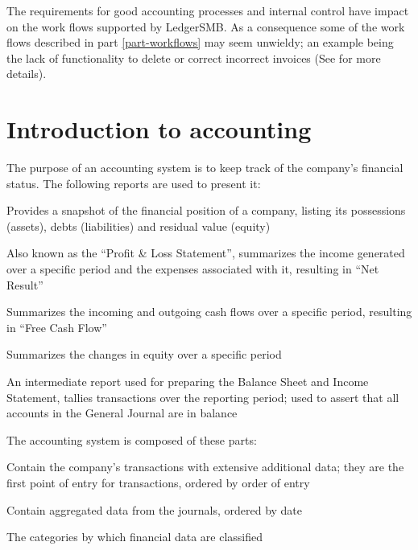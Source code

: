 The requirements for good accounting processes and internal control have impact
on the work flows supported by LedgerSMB. As a consequence some of the work flows
described in part \ref{part-workflows} may seem unwieldy; an example being the
lack of functionality to delete or correct incorrect invoices (See  for more details).



\chapter{Introduction to accounting}
\label{cha-accounting-introduction}

The purpose of an accounting system is to keep track of the company's financial status.  The following reports are used to
present it:

\begin{description}[style=nextline]
	\item[Balance Sheet] Provides a snapshot of the financial position of a company, listing its possessions (assets), debts (liabilities) and residual value (equity)
	\item[Income Statement] Also known as the ``Profit \& Loss Statement'', summarizes the income generated over a specific period and the expenses associated with it, resulting in ``Net Result''
	\item[Cashflow Statement\footnote{\label{cha-accounting-footnote-not-implemented}Not currently implemented in LedgerSMB}] Summarizes the incoming and outgoing cash flows over a specific period, resulting in ``Free Cash Flow''
	\item[Statement of Owner's Equity\footref{cha-accounting-footnote-not-implemented}] Summarizes the changes in equity over a specific period
	\item[Trial Balance] An intermediate report used for preparing the Balance Sheet and Income Statement, tallies transactions over the reporting period; used to assert that all accounts in the General Journal are in balance 
\end{description}

The accounting system is composed of these parts:
\begin{description}[style=nextline]
        \item [Journals] Contain the company's transactions with extensive additional data; they are the first point of entry for transactions, ordered by order of entry
        \item [Ledgers] Contain aggregated data from the journals, ordered by date
        \item [Chart of Accounts] The categories by which financial data are classified
\end{description}

